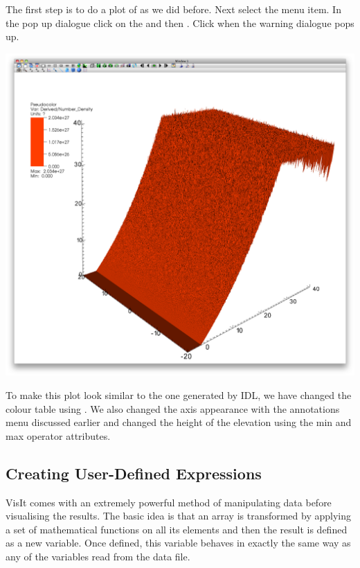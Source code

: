  The first step is to do a  plot of  as
  we did before. Next select the  menu item.
  In the pop up dialogue click on the  and then . Click  when the warning dialogue pops
  up.
  \begin{center}
    \includegraphics[width=0.8\linewidth]{images/visit_shade_surf}
  \end{center}

  To make this plot look similar to the one generated by IDL, we have changed
  the colour table using .
  We also changed the axis appearance with the annotations menu discussed
  earlier and changed the height of the elevation using the min and max
  operator attributes.

\subsection{Creating User-Defined Expressions}
  VisIt comes with an extremely powerful method of manipulating data before
  visualising the results. The basic idea is that an array is transformed
  by applying a set of mathematical functions on all its elements and then
  the result is defined as a new variable. Once defined, this variable
  behaves in exactly the same way as any of the variables read from the
  data file.

